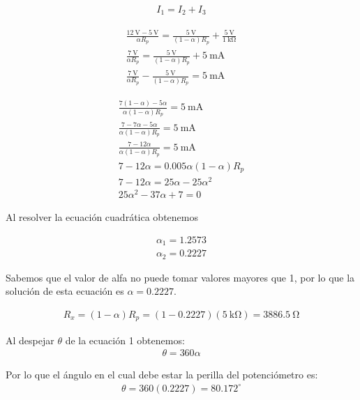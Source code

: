 \documentclass{article}
\begin{document}
	\begin{align}
		I_1 = I_2 + I_3 \nonumber
	\end{align}
	
	\begin{align}
	\frac{\qty{12}{\volt} - \qty{5}{\volt}}{\alpha R_p} = \frac{\qty{5}{\volt}}{(1-\alpha)R_p} + \frac{\qty{5}{\volt}}{\qty{1}{\kohm}} \nonumber \\
	\frac{\qty{7}{\volt}}{\alpha R_p} = \frac{\qty{5}{\volt}}{(1-\alpha)R_p} + \qty{5}{\milli\ampere} \nonumber \\
	\frac{\qty{7}{\volt}}{\alpha R_p} - \frac{\qty{5}{\volt}}{(1-\alpha)R_p} = \qty{5}{\milli\ampere} \nonumber
\end{align}

	\begin{align}
		\frac{7(1 - \alpha) - 5\alpha}{\alpha (1 - \alpha) R_p} = \qty{5}{\milli\ampere} \nonumber \\
\frac{7 - 7\alpha - 5\alpha}{\alpha (1 - \alpha) R_p} = \qty{5}{\milli\ampere} \nonumber \\
\frac{7 - 12 \alpha}{\alpha (1 - \alpha) R_p} = \qty{5}{\milli\ampere} \nonumber \\
7 - 12\alpha = 0.005\alpha (1-\alpha)R_p \nonumber \\
7 - 12\alpha = 25\alpha - 25 \alpha ^2 \nonumber \\
25 \alpha ^2 - 37\alpha + 7 = 0
	\end{align}
	
	Al resolver la ecuación cuadrática obtenemos
	
	\begin{align}
		\alpha_1 = 1.2573 \nonumber \\
		\alpha_2 = 0.2227 \nonumber
	\end{align}
	
	Sabemos que el valor de alfa no puede tomar valores mayores que 1, por lo que la solución de esta ecuación es $\alpha=0.2227$.
	
	\begin{align}
		R_x = (1 - \alpha) R_p = (1 - 0.2227)(\qty{5}{\kohm}) = \qty{3886.5}{\ohm} \nonumber
	\end{align}
	
	Al despejar $\theta$ de la ecuación 1 obtenemos:
	\begin{align}
		\theta = 360 \alpha
	\end{align}
	
	Por lo que el ángulo en el cual debe estar la perilla del potenciómetro es:
	\begin{align}
		\theta = 360(0.2227) = 80.172^{\circ} \nonumber
	\end{align}
	
\end{document}
